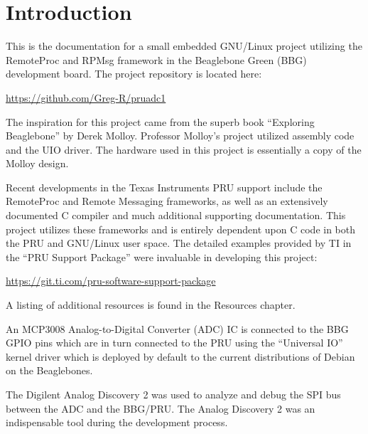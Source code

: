 %
%
%

\chapter{Introduction}

This is the documentation for a small embedded GNU/Linux project utilizing the RemoteProc and RPMsg framework in the Beaglebone Green (BBG) development board.  The project repository is located here:

\url{https://github.com/Greg-R/pruadc1}

The inspiration for this project came from the superb book ``Exploring Beaglebone'' by Derek Molloy.  Professor Molloy's project utilized assembly code and the UIO driver.  The hardware used in this project is essentially a copy of the Molloy design.

Recent developments in the Texas Instruments PRU support include the RemoteProc and Remote Messaging frameworks, as well as an extensively documented C compiler and much additional supporting documentation.  This project utilizes these frameworks and is entirely dependent upon C code in both the PRU and GNU/Linux user space.  The detailed examples provided by TI in the ``PRU Support Package'' were invaluable in developing this project:

\url{https://git.ti.com/pru-software-support-package}

A listing of additional resources is found in the Resources chapter.

An MCP3008 Analog-to-Digital Converter (ADC) IC is connected to the BBG GPIO pins which are in turn connected to the PRU using the ``Universal IO'' kernel driver which is deployed by default to the current distributions of Debian on the Beaglebones.

The Digilent Analog Discovery 2 was used to analyze and debug the SPI bus between the ADC and the BBG/PRU.  The Analog Discovery 2 was an indispensable tool during the development process.
